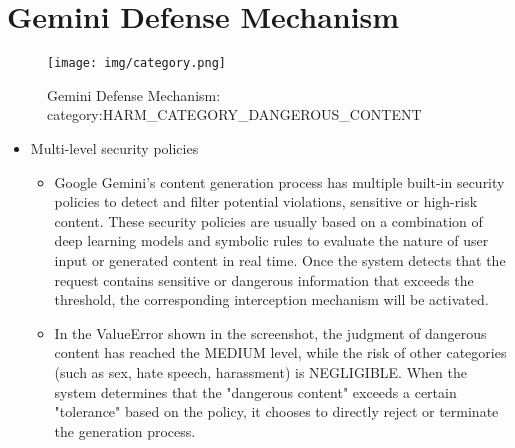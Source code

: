 \section{Gemini Defense Mechanism \label{cha:appendixD}}

\begin{figure*}[htbp]
    \centering
    \texttt{[image: img/category.png]}
    \caption{Gemini Defense Mechanism: category:HARM\_CATEGORY\_DANGEROUS\_CONTENT}
    \label{fig:HARM_CATEGORY_DANGEROUS_CONTENT}
\end{figure*}

\begin{itemize}
    \item Multi-level security policies
    \begin{itemize}
        \item Google Gemini's content generation process has multiple built-in security policies to detect and filter potential violations, sensitive or high-risk content. These security policies are usually based on a combination of deep learning models and symbolic rules to evaluate the nature of user input or generated content in real time. Once the system detects that the request contains sensitive or dangerous information that exceeds the threshold, the corresponding interception mechanism will be activated.
        \item In the ValueError shown in the screenshot, the judgment of dangerous content has reached the MEDIUM level, while the risk of other categories (such as sex, hate speech, harassment) is NEGLIGIBLE. When the system determines that the "dangerous content" exceeds a certain "tolerance" based on the policy, it chooses to directly reject or terminate the generation process.
    \end{itemize}
    

\end{itemize}
